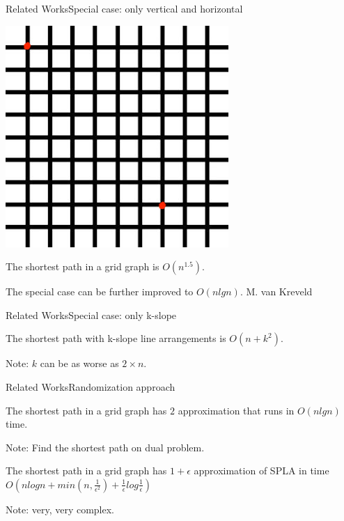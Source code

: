 \documentclass{beamer}
\begin{document}
\begin{frame}{Related Works}{Special case: only vertical and horizontal}
   \begin{center}
    \includegraphics[width=0.3\linewidth]{grid2.jpg}
  \end{center}
  \begin{theorem} 
    The shortest path in a grid graph is $O(n^{1.5})$. \cite{eppstein1997efficient}
  \end{theorem}
  \begin{theorem} 
    The special case can be further improved to $O(nlgn)$.  M. van Kreveld
  \end{theorem}
\end{frame}


\begin{frame}{Related Works}{Special case: only k-slope}
  \begin{theorem} 
    The shortest path with k-slope line arrangements is $O(n + k^2)$. \cite{eppstein1999shortest}
  \end{theorem}
  Note: $k$ can be as worse as $2 \times n$.
\end{frame}


\begin{frame}{Related Works}{Randomization approach }
  \begin{theorem} 
    The shortest path in a grid graph has $2$ approximation that runs in $O(nlgn)$ time. \cite{hart2001approximating}
  \end{theorem}
  Note: Find the shortest path on dual problem.
  \begin{theorem} 
    The shortest path in a grid graph has $1 + \epsilon$ approximation of SPLA in time $O(nlogn + min(n, \frac{1}{\epsilon^2}) + \frac{1}{\epsilon} log \frac{1}{\epsilon})$
  \end{theorem}
  Note: very, very complex. 
\end{frame}
\end{document}
